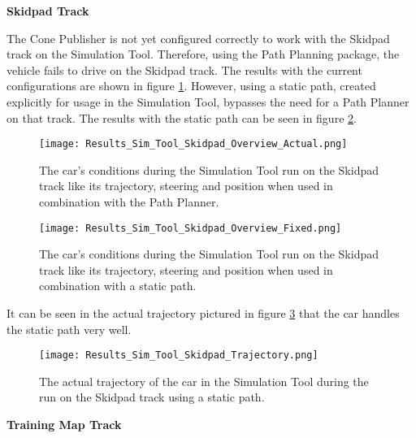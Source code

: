 \textbf{Skidpad Track}

The Cone Publisher is not yet configured correctly to work with the Skidpad track on the Simulation Tool. Therefore, using the Path Planning package, the vehicle fails to drive on the Skidpad track. The results with the current configurations are shown in figure \ref{fig:Results Sim Tool Skidpad Overview Actual}.
However, using a static path, created explicitly for usage in the Simulation Tool, bypasses the need for a Path Planner on that track. The results with the static path can be seen in figure \ref{fig:Results Sim Tool Skidpad Overview Fixed}.
\begin{figure}[H]
    \centering
    \texttt{[image: Results\_Sim\_Tool\_Skidpad\_Overview\_Actual.png]}
    \caption{The car's conditions during the Simulation Tool run on the Skidpad track like its trajectory, steering and position when used in combination with the Path Planner.}
    \label{fig:Results Sim Tool Skidpad Overview Actual}
\end{figure}
\begin{figure}[H]
    \centering
    \texttt{[image: Results\_Sim\_Tool\_Skidpad\_Overview\_Fixed.png]}
    \caption{The car's conditions during the Simulation Tool run on the Skidpad track like its trajectory, steering and position when used in combination with a static path.}
    \label{fig:Results Sim Tool Skidpad Overview Fixed}
\end{figure}

It can be seen in the actual trajectory pictured in figure \ref{fig:Results Sim Tool Skidpad Trajectory} that the car handles the static path very well.
\begin{figure}[H]
    \centering
    \texttt{[image: Results\_Sim\_Tool\_Skidpad\_Trajectory.png]}
    \caption{The actual trajectory of the car in the Simulation Tool during the run on the Skidpad track using a static path.}
    \label{fig:Results Sim Tool Skidpad Trajectory}
\end{figure}

\pagebreak

\textbf{Training Map Track}

